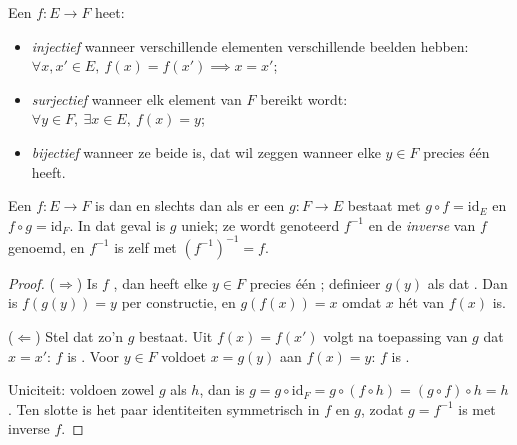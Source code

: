 \begin{definition}\label{def:b1:logic:inj}
Een  $f \colon E \to F$ heet:
\begin{itemize}
  \item \emph{injectief} wanneer verschillende elementen
        verschillende beelden hebben: $\forall x, x' \in E,\ f(x) = f(x')
        \implies x = x'$;
  \item \emph{surjectief} wanneer elk element van $F$
        bereikt wordt: $\forall y \in F,\ \exists x \in E,\ f(x) = y$;
  \item \emph{bijectief} wanneer ze beide is, dat wil
        zeggen wanneer elke $y \in F$ precies één  heeft.
\end{itemize}
\end{definition}

\begin{theorem}\label{thm:b1:logic:inverse}
Een  $f \colon E \to F$ is  dan en slechts dan als er
een  $g \colon F \to E$ bestaat met $g \circ f =
\mathrm{id}_E$ en $f \circ g = \mathrm{id}_F$. In dat geval is $g$ uniek;
ze wordt genoteerd $f^{-1}$ en de \emph{inverse} van $f$ genoemd, en
$f^{-1}$ is zelf  met $(f^{-1})^{-1} = f$.
\end{theorem}

\begin{proof}
($\Rightarrow$) Is $f$ , dan heeft elke $y \in F$ precies één
; definieer $g(y)$ als dat . Dan is $f(g(y)) = y$ per
constructie, en $g(f(x)) = x$ omdat $x$ hét  van $f(x)$ is.

($\Leftarrow$) Stel dat zo'n $g$ bestaat. Uit $f(x) = f(x')$ volgt na
toepassing van $g$ dat $x = x'$: $f$ is . Voor $y \in F$
voldoet $x = g(y)$ aan $f(x) = y$: $f$ is .

Uniciteit: voldoen zowel $g$ als $h$, dan is $g = g \circ \mathrm{id}_F
= g \circ (f \circ h) = (g \circ f) \circ h = h$. Ten slotte is het paar
identiteiten symmetrisch in $f$ en $g$, zodat $g = f^{-1}$  is
met inverse $f$.
\end{proof}

